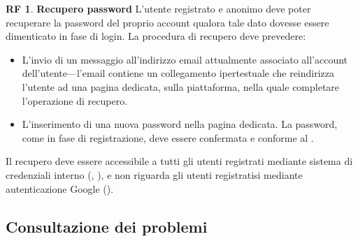 \documentclass[11pt, a4paper]{article}
\theoremstyle{definition}
\newtheorem{funcreq}{RF} %
\begin{document}
\begin{funcreq}
\label{savepassword}
\textbf{Recupero password }
L'utente registrato e anonimo deve poter recuperare la password del proprio
account qualora tale dato dovesse essere dimenticato in fase di login. La
procedura di recupero deve prevedere:
\begin{itemize}
    \item L'invio di un messaggio all'indirizzo email attualmente associato
    all'account dell'utente—l'email contiene un collegamento ipertestuale
    che reindirizza l'utente ad una pagina dedicata, sulla piattaforma, nella
    quale completare l'operazione di recupero.

    \item L'inserimento di una nuova password nella pagina dedicata. La password, come in fase di
    registrazione, deve essere confermata e conforme al \textcolor{blue}{}.
\end{itemize}
Il recupero deve essere accessibile a tutti gli utenti registrati mediante
sistema di credenziali interno (\textcolor{blue}{}, \textcolor{blue}{}),
e non riguarda gli utenti registratisi mediante autenticazione Google
(\textcolor{blue}{}).
\end{funcreq}

\subsection{Consultazione dei problemi}
\end{document}
